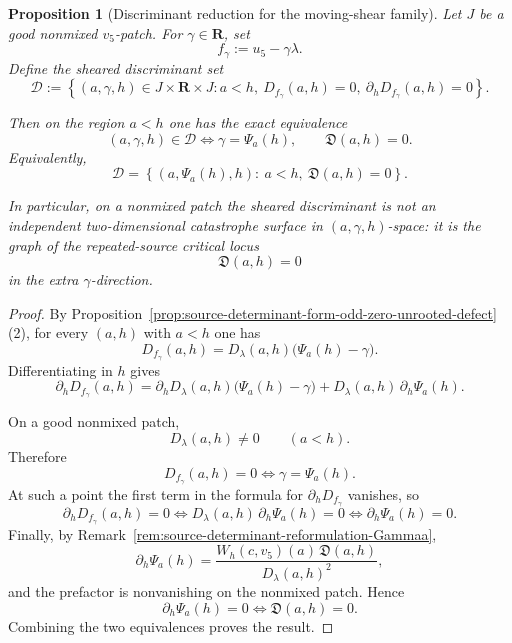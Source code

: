 \documentclass[11pt,a4paper]{amsart}
\theoremstyle{plain}
\newtheorem{proposition}[theorem]{Proposition}
\theoremstyle{definition}
\begin{document}
\begin{proposition}[Discriminant reduction for the moving-shear family]
\label{prop:discriminant-reduction-moving-shear}
Let $J$ be a good nonmixed $v_5$-patch. For $\gamma\in\mathbf R$, set
\[
f_\gamma:=u_5-\gamma\lambda.
\]
Define the sheared discriminant set
\[
\mathcal D:=
\left\{
(a,\gamma,h)\in J\times\mathbf R\times J:
a<h,\
D_{f_\gamma}(a,h)=0,\
\partial_h D_{f_\gamma}(a,h)=0
\right\}.
\]

Then on the region $a<h$ one has the exact equivalence
\[
(a,\gamma,h)\in\mathcal D
\iff
\gamma=\Psi_a(h),
\qquad
\mathfrak D(a,h)=0.
\]
Equivalently,
\[
\mathcal D
=
\left\{
(a,\Psi_a(h),h):\ a<h,\ \mathfrak D(a,h)=0
\right\}.
\]

In particular, on a nonmixed patch the sheared discriminant is not an
independent two-dimensional catastrophe surface in $(a,\gamma,h)$-space:
it is the graph of the repeated-source critical locus
\[
\mathfrak D(a,h)=0
\]
in the extra $\gamma$-direction.
\end{proposition}

\begin{proof}
By Proposition~\ref{prop:source-determinant-form-odd-zero-unrooted-defect}(2),
for every $(a,h)$ with $a<h$ one has
\[
D_{f_\gamma}(a,h)
=
D_\lambda(a,h)\bigl(\Psi_a(h)-\gamma\bigr).
\]
Differentiating in $h$ gives
\[
\partial_h D_{f_\gamma}(a,h)
=
\partial_h D_\lambda(a,h)\bigl(\Psi_a(h)-\gamma\bigr)
+
D_\lambda(a,h)\,\partial_h\Psi_a(h).
\]

On a good nonmixed patch,
\[
D_\lambda(a,h)\neq 0
\qquad (a<h).
\]
Therefore
\[
D_{f_\gamma}(a,h)=0
\iff
\gamma=\Psi_a(h).
\]
At such a point the first term in the formula for $\partial_h D_{f_\gamma}$
vanishes, so
\[
\partial_h D_{f_\gamma}(a,h)=0
\iff
D_\lambda(a,h)\,\partial_h\Psi_a(h)=0
\iff
\partial_h\Psi_a(h)=0.
\]
Finally, by
Remark~\ref{rem:source-determinant-reformulation-Gammaa},
\[
\partial_h\Psi_a(h)
=
\frac{W_h(c,v_5)(a)\,\mathfrak D(a,h)}{D_\lambda(a,h)^2},
\]
and the prefactor is nonvanishing on the nonmixed patch. Hence
\[
\partial_h\Psi_a(h)=0
\iff
\mathfrak D(a,h)=0.
\]
Combining the two equivalences proves the result.
\end{proof}
\end{document}
